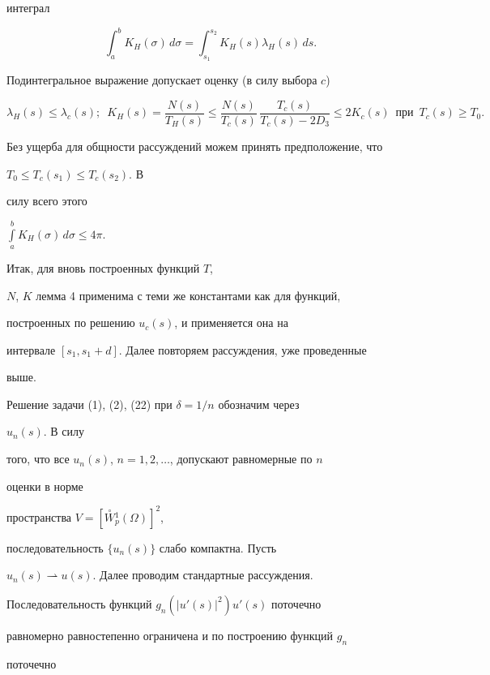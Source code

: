 \begin{pf}
интеграл 


$$ 


\int^b_a K_H(\sigma)\,d\sigma= 


\int^{s_2}_{s_1}K_H(s)\lambda_H(s)\,ds. 


$$ 


Подинтегральное выражение допускает оценку (в силу выбора $c$) 


$$ 


\lambda_H(s)\le\lambda_c(s);\ \; K_H(s)= 


\frac{N(s)}{T_H(s)}\le\frac{N(s)}{T_c(s)}\,


\frac{T_c(s)}{T_c(s)-2D_3}\le 2K_c(s) 


\ \;\text{при} 


\ \; T_c(s)\ge T_0. 


$$ 


Без ущерба для общности рассуждений можем принять предположение, что


$T_0\le T_c(s_1)\le T_c(s_2)$. В 


силу всего этого 


$\int\limits^b_a K_H(\sigma)\,d\sigma\le 4\pi$.


Итак, для вновь построенных функций $T$, 


$N$, $K$ лемма 4 применима с теми же константами как для функций, 


построенных по решению $u_c(s)$, и применяется она на 


интервале $[s_1,s_1+d]$. Далее повторяем рассуждения, уже проведенные 


выше. 


 


Решение задачи (1), (2), (22) при $\delta=1/n$ обозначим через 


$u_n(s)$. В силу 


того, что все $u_n(s)$, $n=1,2,\dotsc$, допускают равномерные по $n$ 


оценки в норме 


пространства $V=[\overset{\circ}{W}{}^1_p(\Omega)]^2$, 


последовательность $\{u_n(s)\}$ слабо компактна. Пусть 


$u_n(s)\rightharpoonup u(s)$. Далее проводим стандартные рассуждения. 


Последовательность функций $g_n(|u'(s)|^2)u'(s)$ поточечно


равномерно равностепенно ограничена и по построению функций $g_n$ 


поточечно 



\end{pf}
